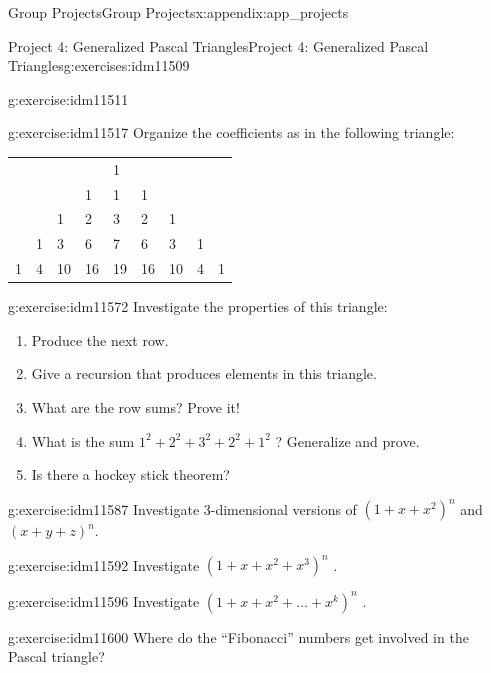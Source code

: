 \documentclass[oneside,10pt,]{book}
\numberwithin{equation}{chapter}
\begin{document}
\begin{appendixptx}{Group Projects}{}{Group Projects}{}{}{x:appendix:app_projects}
\begin{exercises-section-numberless}{Project 4: Generalized Pascal Triangles}{}{Project 4: Generalized Pascal Triangles}{}{}{g:exercises:idm11509}
\begin{divisionexercise}{1}{}{}{g:exercise:idm11511}
\end{divisionexercise}%
\begin{divisionexercise}{2}{}{}{g:exercise:idm11517}%
Organize the coefficients as in the following triangle:%
\begin{sidebyside}{1}{0.1}{0.1}{0}%
\begin{sbspanel}{0.8}%
{\centering%
\begin{tabular}{lllllllll}
&&&&1&&&&\tabularnewline[0pt]
&&&1&1&1&&&\tabularnewline[0pt]
&&1&2&3&2&1&&\tabularnewline[0pt]
&1&3&6&7&6&3&1&\tabularnewline[0pt]
1&4&10&16&19&16&10&4&1
\end{tabular}
\par}
\end{sbspanel}%
\end{sidebyside}%
\end{divisionexercise}%
\begin{divisionexercise}{3}{}{}{g:exercise:idm11572}%
Investigate the properties of this triangle:%
\begin{enumerate}[label=(\alph*)]
\item{}Produce the next row.%
\item{}Give a recursion that produces elements in this triangle.%
\item{}What are the row sums? Prove it!%
\item{}What is the sum \(1^{2} + 2^{2} + 3^{2} + 2^{2} + 1^{2}\) ? Generalize and prove.%
\item{}Is there a hockey stick theorem?%
\end{enumerate}
%
\end{divisionexercise}%
\begin{divisionexercise}{4}{}{}{g:exercise:idm11587}%
Investigate 3-dimensional versions of \(\left( 1 + x + x^{2} \right)^{n}\) and \(\left( x + y + z \right)^{n}.\)%
\end{divisionexercise}%
\begin{divisionexercise}{5}{}{}{g:exercise:idm11592}%
Investigate \(\left( 1 + x + x^{2} + x^{3} \right)^{n}\) .%
\end{divisionexercise}%
\begin{divisionexercise}{6}{}{}{g:exercise:idm11596}%
Investigate \(\left( 1 + x + x^{2} + \ldots + x^{k} \right)^{n}\) .%
\end{divisionexercise}%
\begin{divisionexercise}{7}{}{}{g:exercise:idm11600}%
Where do the ``Fibonacci'' numbers get involved in the Pascal triangle?%
\end{divisionexercise}%

\end{exercises-section-numberless}
\end{appendixptx}
\end{document}
